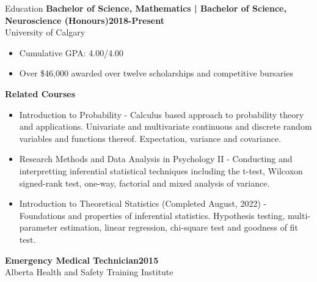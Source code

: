 \documentclass[12pt]{resume}
\begin{document}
\begin{rSection}{\Large Education}
   {\bf Bachelor of Science, Mathematics | Bachelor of Science, Neuroscience (Honours)\hfill{2018-Present}}\\
   University of Calgary
   \begin{itemize}
        \setlength\itemsep{-0.5em}
       \item Cumulative GPA: 4.00/4.00 
       \item Over \$46,000 awarded over twelve scholarships and competitive bursaries 
   \end{itemize}
   {\bf Related Courses}
   \begin{itemize}
        \setlength\itemsep{-0.5em}
        \item Introduction to Probability - Calculus based approach to probability theory and applications. 
        Univariate and multivariate continuous and discrete random variables and functions thereof. Expectation, 
        variance and covariance. 
        \item Research Methods and Data Analysis in Psychology II - Conducting and interpretting inferential 
        statistical techniques including the t-test, Wilcoxon signed-rank test, one-way, factorial and mixed 
        analysis of variance. 
        \item Introduction to Theoretical Statistics (Completed August, 2022) - Foundations and properties of
        inferential statistics. Hypothesis testing, multi-parameter estimation, linear regression, chi-square 
        test and goodness of fit test.
   \end{itemize}
   {\bf Emergency Medical Technician\hfill {2015}}\\
   Alberta Health and Safety Training Institute
\end{rSection}
\vspace{12pt}
\end{document}
